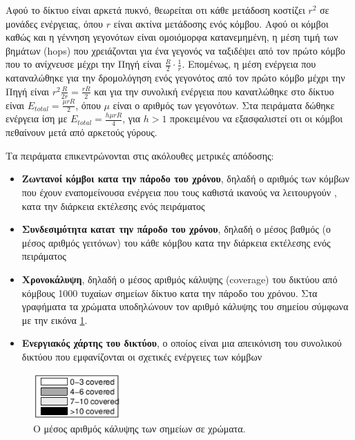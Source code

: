 Αφού το δίκτυο είναι αρκετά πυκνό, θεωρείται οτι κάθε μετάδοση κοστίζει $r^{2}$ σε μονάδες ενέργειας, όπου $r$ είναι ακτίνα μετάδοσης ενός κόμβου. Αφού οι κόμβοι
καθώς και η γέννηση γεγονότων είναι ομοιόμορφα κατανεμημένη, η μέση τιμή των βημάτων (hops) που χρειάζονται για ένα γεγονός να ταξιδέψει από τον πρώτο κόμβο που το
ανίχνευσε μέχρι την Πηγή είναι $\frac{R}{2}\cdot \frac{1}{r}$. Επομένως, η μέση ενέργεια που καταναλώθηκε για την δρομολόγηση ενός γεγονότος από τον πρώτο κόμβο μέχρι
την Πηγή είναι $r^2\frac{R}{2r} = \frac{rR}{2}$ και για την συνολική ενέργεια που κανατλώθηκε στο δίκτυο είναι $E_{total} = \frac{\mu r R}{2}$, όπου $\mu$ είναι ο
αριθμός των γεγονότων. Στα πειράματα δώθηκε ενέργεια ίση με $E_{total} = \frac{h\mu r R}{4}$, για $h > 1$ προκειμένου να εξασφαλιστεί οτι οι κόμβοι πεθαίνουν μετά
από αρκετούς γύρους.

Τα πειράματα επικεντρώνονται στις ακόλουθες μετρικές απόδοσης:
\begin{itemize}
\item \textbf{Ζωντανοί κόμβοι κατα την πάροδο του χρόνου}, δηλαδή ο αριθμός των κόμβων που έχουν εναπομείνουσα ενέργεια που τους καθιστά ικανούς να λειτουργούν , κατα
την διάρκεια εκτέλεσης ενός πειράματος
\item \textbf{Συνδεσιμότητα κατατ την πάροδο του χρόνου}, δηλαδή ο μέσος βαθμός (ο μέσος αριθμός γειτόνων) του κάθε κόμβου κατα την διάρκεια εκτέλεσης ενός πειράματος
\item \textbf{Χρονοκάλυψη}, δηλαδή ο μέσος αριθμός κάλυψης (coverage) του δικτύου από κόμβους 1000 τυχαίων σημείων δίκτυο κατα την πάροδο του χρόνου. Στα γραφήματα τα
χρώματα υποδηλώνουν τον αριθμό κάλυψης του σημείου σύμφωνα με την εικόνα \ref{fig:coverage_sample}.
\item \textbf{Ενεργιακός χάρτης του δικτύου}, ο οποίος είναι μια απεικόνιση του συνολικού δικτύου που εμφανίζονται οι σχετικές ενέργειες των κόμβων
\end{itemize}

\begin{figure}[h]
  \centering
  \includegraphics[width=0.3\textwidth]{images/network_coverage.eps}
  \caption{Ο μέσος αριθμός κάλυψης των σημείων σε χρώματα.}
  \label{fig:coverage_sample}
\end{figure}

